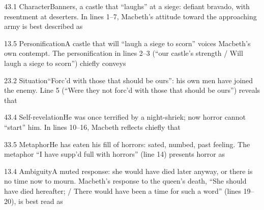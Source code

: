 \documentclass[11pt]{article}
\begin{document}
\begin{q}{4}{3.1 Character}{Banners, a castle that ``laughs'' at a siege: defiant bravado, with resentment at deserters.}
In lines 1--7, Macbeth's attitude toward the approaching army is best described as
\end{q}

\begin{q}{1}{3.5 Personification}{A castle that will ``laugh a siege to scorn'' voices Macbeth's own contempt.}
The personification in lines 2--3 (``our castle's strength / Will laugh a siege to scorn'') chiefly conveys
\end{q}

\begin{q}{2}{3.2 Situation}{``Forc'd with those that should be ours'': his own men have joined the enemy.}
Line 5 (``Were they not forc'd with those that should be ours'') reveals that
\end{q}

\begin{q}{4}{3.4 Self-revelation}{He was once terrified by a night-shriek; now horror cannot ``start'' him.}
In lines 10--16, Macbeth reflects chiefly that
\end{q}

\begin{q}{3}{3.5 Metaphor}{He has eaten his fill of horrors: sated, numbed, past feeling.}
The metaphor ``I have supp'd full with horrors'' (line 14) presents horror as
\end{q}

\begin{q}{1}{3.4 Ambiguity}{A muted response: she would have died later anyway, or there is no time now to mourn.}
Macbeth's response to the queen's death, ``She should have died hereafter; / There would have been a time for such a word'' (lines 19--20), is best read as
\end{q}
\end{document}
